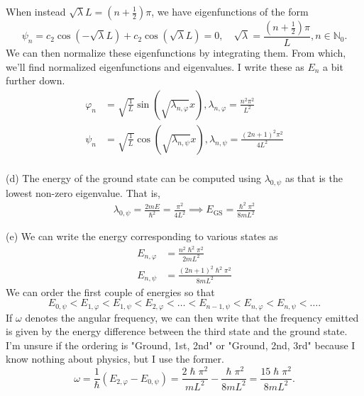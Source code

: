 \documentclass[12pt]{article}
\newcommand{\bbN}{\mathbb{N}}
\renewcommand{\phi}{\varphi}
\theoremstyle{definition}
\theoremstyle{remark}
\begin{document}
  When instead $\sqrt{\lambda} L = (n +\frac{1}{2}) \pi$, we have eigenfunctions of the form
  \begin{equation*}
      \psi_{n} = c_{2} \cos(- \sqrt{\lambda} L) + c_{2} \cos(\sqrt{\lambda}L) = 0, \quad \sqrt{\lambda} = \frac{(n + \frac{1}{2}) \pi}{L}, n\in \bbN_{0}.
  \end{equation*}
  We can then normalize these eigenfunctions by integrating them. From which, we'll find normalized eigenfunctions and eigenvalues. I write these as $E_{n}$ a bit further down.
  \begin{align*}
      \phi_{n} &= \sqrt{\frac{1}{L}} \sin( \sqrt{\lambda_{n, \phi}} x),  \lambda_{n, \phi} = \frac{n^{2} \pi^{2}}{L^{2}}\\
      \psi_{n} &= \sqrt{\frac{1}{L}} \cos( \sqrt{\lambda_{n, \psi}} x),  \lambda_{n, \psi} = \frac{(2n + 1)^{2} \pi^{2}}{4L^{2}}\\
  \end{align*}

  (d) The energy of the ground state can be computed using $\lambda_{0, \psi}$ as that is the lowest non-zero eigenvalue. That is,
  \begin{align*}
      \lambda_{0, \psi} = \frac{2mE}{\hslash^{2}} = \frac{\pi^{2}}{4L^{2}} \implies E_{\text{GS}} = \frac{\hslash^{2}\pi^{2}}{8mL^{2}}
  \end{align*}

  (e) We can write the energy corresponding to various states as
  \begin{align*}
      E_{n, \phi} &= \frac{n^{2}\hslash^{2} \pi^{2}}{ 2mL^{2}}\\
      E_{n, \psi} &= \frac{(2n + 1)^{2} \hslash^{2}\pi^{2}}{8mL^{2}} 
  \end{align*}
  We can order the first couple of energies so that
  \begin{equation*}
      E_{0, \psi} < E_{1, \phi} < E_{1, \psi} < E_{2, \phi} < \ldots < E_{n-1, \psi} < E_{n, \phi} < E_{n, \psi} < \ldots.
  \end{equation*}
  If $\omega$ denotes the angular frequency, we can then write that the frequency emitted is given by the energy difference between the third state and the ground state. I'm unsure if the ordering is "Ground, 1st, 2nd" or "Ground, 2nd, 3rd" because I know nothing about physics, but I use the former.
   \begin{equation*}
       \omega = \frac{1}{\hslash} \left( E_{2, \phi} - E_{0, \psi} \right) = \frac{2\hslash\pi^{2}}{mL^{2}} - \frac{\hslash\pi^{2}}{8mL^{2}} = \frac{15\hslash \pi^{2}}{8mL^{2}}.
  \end{equation*}
\end{document}
